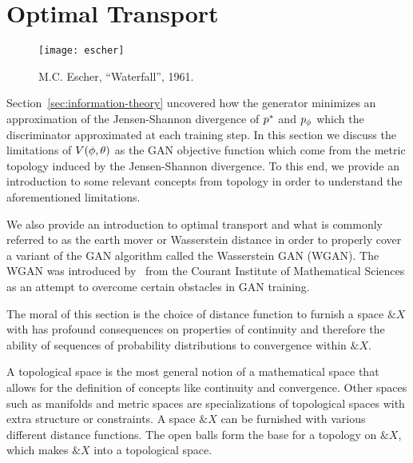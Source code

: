 \section{Optimal Transport}%
\label{sec:optimal-transport}

\vspace{1cm}

\begin{figure}[h]%
  \label{fig:paradise}
  \centering
   {
    \texttt{[image: escher]}
  }
  \caption{M.C. Escher, ``Waterfall'', 1961.}
\end{figure}

\vspace{1cm}

\noindent Section~\ref{sec:information-theory} uncovered how the
generator minimizes an approximation of the Jensen-Shannon divergence
of $p^*$ and $p_{\phi}$ which the discriminator approximated at each
training step.  In this section we discuss the limitations of $V(\phi, \theta)$ as
the GAN objective function which come from the metric topology induced
by the Jensen-Shannon divergence. To this end, we provide an
introduction to some relevant concepts from topology in order to
understand the aforementioned limitations.

We also provide an introduction to optimal transport and what is
commonly referred to as the earth mover or Wasserstein distance in
order to properly cover a variant of the GAN algorithm called the
Wasserstein GAN (WGAN). The WGAN was introduced
by~\cite{ref:arjovsky-2017} from the Courant Institute of Mathematical
Sciences as an attempt to overcome certain obstacles in GAN training.

The moral of this section is the choice of distance function to
furnish a space $\&X$ with has profound consequences on properties of
continuity and therefore the ability of sequences of probability
distributions to convergence within $\&X$.


A topological space is the most general notion of a mathematical space
that allows for the definition of concepts like continuity and
convergence.  Other spaces such as manifolds and metric spaces are
specializations of topological spaces with extra structure or
constraints.  A space $\&X$ can be furnished with various different
distance functions.  The open balls form the base for a topology on
$\&X$, which makes $\&X$ into a topological space.

